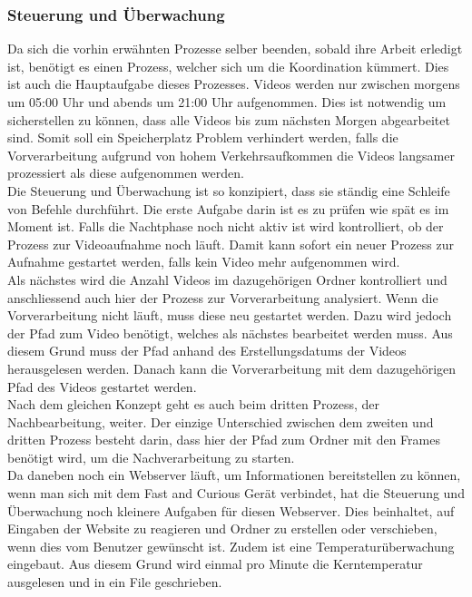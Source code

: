 \subsubsection{Steuerung und Überwachung}
Da sich die vorhin erwähnten Prozesse selber beenden, sobald ihre Arbeit erledigt ist, benötigt es einen Prozess, welcher sich um die Koordination kümmert. Dies ist auch die Hauptaufgabe dieses Prozesses. Videos werden nur zwischen morgens um 05:00 Uhr und abends um 21:00 Uhr aufgenommen. Dies ist notwendig um sicherstellen zu können, dass alle Videos bis zum nächsten Morgen abgearbeitet sind. Somit soll ein Speicherplatz Problem verhindert werden, falls die Vorverarbeitung aufgrund von hohem Verkehrsaufkommen die Videos langsamer prozessiert als diese aufgenommen werden.\\
Die Steuerung und Überwachung ist so konzipiert, dass sie ständig eine Schleife von Befehle durchführt. Die erste Aufgabe darin ist es zu prüfen wie spät es im Moment ist. Falls die Nachtphase noch nicht aktiv ist wird kontrolliert, ob der Prozess zur Videoaufnahme noch läuft. Damit kann sofort ein neuer Prozess zur Aufnahme gestartet werden, falls kein Video mehr aufgenommen wird.\\
Als nächstes wird die Anzahl Videos im dazugehörigen Ordner kontrolliert und anschliessend auch hier der Prozess zur Vorverarbeitung analysiert. Wenn die Vorverarbeitung nicht läuft, muss diese neu gestartet werden. Dazu wird jedoch der Pfad zum Video benötigt, welches als nächstes bearbeitet werden muss. Aus diesem Grund muss der Pfad anhand des Erstellungsdatums der Videos herausgelesen werden. Danach kann die Vorverarbeitung mit dem dazugehörigen Pfad des Videos gestartet werden.\\
Nach dem gleichen Konzept geht es auch beim dritten Prozess, der Nachbearbeitung, weiter. Der einzige Unterschied zwischen dem zweiten und dritten Prozess besteht darin, dass hier der Pfad zum Ordner mit den Frames benötigt wird, um die Nachverarbeitung zu starten.\\
Da daneben noch ein Webserver läuft, um Informationen bereitstellen zu können, wenn man sich mit dem Fast and Curious Gerät verbindet, hat die Steuerung und Überwachung noch kleinere Aufgaben für diesen Webserver. Dies beinhaltet, auf Eingaben der Website zu reagieren und Ordner zu erstellen oder verschieben, wenn dies vom Benutzer gewünscht ist. Zudem ist eine Temperaturüberwachung eingebaut. Aus diesem Grund wird einmal pro Minute die Kerntemperatur ausgelesen und in ein File geschrieben.